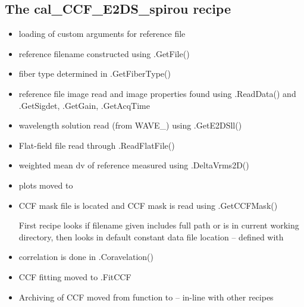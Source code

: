 \subsection{The cal\_CCF\_E2DS\_spirou recipe}
\label{ch:changelog:At4:cal_CCF_E2DS_spirou}

\begin{itemize}
\item loading of custom arguments for reference file

\item reference filename constructed using \spirouStartup.GetFile()

\item fiber type determined in \spirouStartup.GetFiberType()

\item reference file image read and image properties found using \spirouImage.ReadData() and \spirouImage.GetSigdet, \spirouImage.GetGain, \spirouImage.GetAcqTime

\item wavelength solution read (from WAVE\_) using \spirouTHORCA.GetE2DSll()

\item Flat-field file read through \spirouImage.ReadFlatFile()

\item weighted mean dv of reference measured using \spirouRV.DeltaVrms2D()

\item plots moved to \spirouPlot

\item CCF mask file is located and CCF mask is read using \spirouRV.GetCCFMask()
	\begin{note}
	First recipe looks if filename given includes full path or is in current working directory, then looks in default constant data file location -- defined with 
	\end{note}

\item correlation is done in \spirouRV.Coravelation()

\item CCF fitting moved to \spirouRV.FitCCF

\item Archiving of CCF moved from function to \progMAIN -- in-line with other recipes

\end{itemize}


